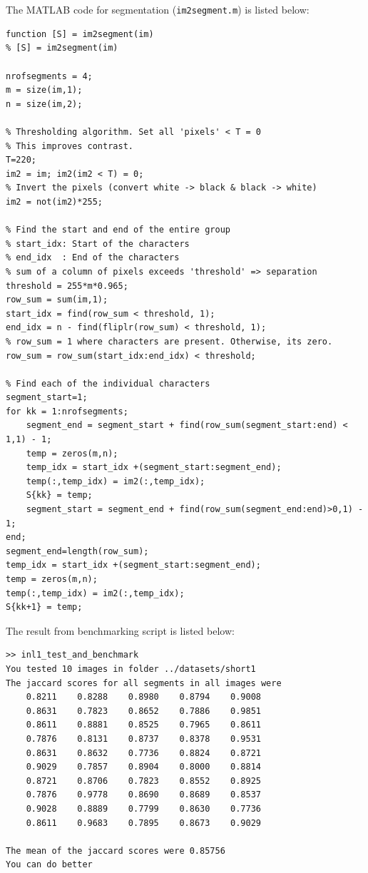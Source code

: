 \documentclass[11pt]{article} %
\begin{document}
\section{}

\section{}

The MATLAB code for segmentation (\texttt{im2segment.m}) is listed below:
\begin{verbatim}
function [S] = im2segment(im)
% [S] = im2segment(im)

nrofsegments = 4;
m = size(im,1);
n = size(im,2);

% Thresholding algorithm. Set all 'pixels' < T = 0
% This improves contrast.
T=220;
im2 = im; im2(im2 < T) = 0;
% Invert the pixels (convert white -> black & black -> white)
im2 = not(im2)*255;

% Find the start and end of the entire group
% start_idx: Start of the characters
% end_idx  : End of the characters
% sum of a column of pixels exceeds 'threshold' => separation
threshold = 255*m*0.965;
row_sum = sum(im,1);
start_idx = find(row_sum < threshold, 1);
end_idx = n - find(fliplr(row_sum) < threshold, 1);
% row_sum = 1 where characters are present. Otherwise, its zero.
row_sum = row_sum(start_idx:end_idx) < threshold;

% Find each of the individual characters
segment_start=1;
for kk = 1:nrofsegments;
    segment_end = segment_start + find(row_sum(segment_start:end) < 1,1) - 1;
    temp = zeros(m,n); 
    temp_idx = start_idx +(segment_start:segment_end);
    temp(:,temp_idx) = im2(:,temp_idx);
    S{kk} = temp;
    segment_start = segment_end + find(row_sum(segment_end:end)>0,1) - 1;
end;
segment_end=length(row_sum);
temp_idx = start_idx +(segment_start:segment_end);
temp = zeros(m,n);
temp(:,temp_idx) = im2(:,temp_idx);
S{kk+1} = temp;
\end{verbatim}

The result from benchmarking script is listed below:
\begin{verbatim}
>> inl1_test_and_benchmark
You tested 10 images in folder ../datasets/short1
The jaccard scores for all segments in all images were
    0.8211    0.8288    0.8980    0.8794    0.9008
    0.8631    0.7823    0.8652    0.7886    0.9851
    0.8611    0.8881    0.8525    0.7965    0.8611
    0.7876    0.8131    0.8737    0.8378    0.9531
    0.8631    0.8632    0.7736    0.8824    0.8721
    0.9029    0.7857    0.8904    0.8000    0.8814
    0.8721    0.8706    0.7823    0.8552    0.8925
    0.7876    0.9778    0.8690    0.8689    0.8537
    0.9028    0.8889    0.7799    0.8630    0.7736
    0.8611    0.9683    0.7895    0.8673    0.9029

The mean of the jaccard scores were 0.85756
You can do better
\end{verbatim}
\end{document}

